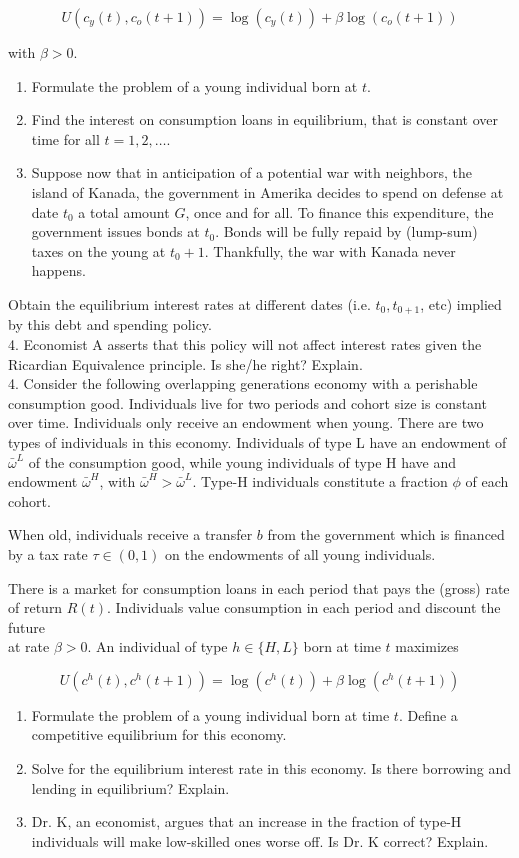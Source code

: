 \documentclass[10pt]{article}
\begin{document}
$$
U\left(c_{y}(t), c_{o}(t+1)\right)=\log \left(c_{y}(t)\right)+\beta \log \left(c_{o}(t+1)\right)
$$

with $\beta>0$.

\begin{enumerate}
  \item Formulate the problem of a young individual born at $t$.
  \item Find the interest on consumption loans in equilibrium, that is constant over time for all $t=1,2, \ldots$.
  \item Suppose now that in anticipation of a potential war with neighbors, the island of Kanada, the government in Amerika decides to spend on defense at date $t_{0}$ a total amount $G$, once and for all. To finance this expenditure, the government issues bonds at $t_{0}$. Bonds will be fully repaid by (lump-sum) taxes on the young at $t_{0}+1$. Thankfully, the war with Kanada never happens.
\end{enumerate}

Obtain the equilibrium interest rates at different dates (i.e. $t_{0}, t_{0+1}$, etc) implied by this debt and spending policy.\\
4. Economist A asserts that this policy will not affect interest rates given the Ricardian Equivalence principle. Is she/he right? Explain.\\
4. Consider the following overlapping generations economy with a perishable consumption good. Individuals live for two periods and cohort size is constant over time. Individuals only receive an endowment when young. There are two types of individuals in this economy. Individuals of type L have an endowment of $\bar{\omega}^{L}$ of the consumption good, while young individuals of type H have and endowment $\bar{\omega}^{H}$, with $\bar{\omega}^{H}>\bar{\omega}^{L}$. Type-H individuals constitute a fraction $\phi$ of each cohort.

When old, individuals receive a transfer $b$ from the government which is financed by a tax rate $\tau \in(0,1)$ on the endowments of all young individuals.

There is a market for consumption loans in each period that pays the (gross) rate of return $R(t)$. Individuals value consumption in each period and discount the future\\
at rate $\beta>0$. An individual of type $h \in\{H, L\}$ born at time $t$ maximizes

$$
U\left(c^{h}(t), c^{h}(t+1)\right)=\log \left(c^{h}(t)\right)+\beta \log \left(c^{h}(t+1)\right)
$$

\begin{enumerate}
  \item Formulate the problem of a young individual born at time $t$. Define a competitive equilibrium for this economy.
  \item Solve for the equilibrium interest rate in this economy. Is there borrowing and lending in equilibrium? Explain.
  \item Dr. K, an economist, argues that an increase in the fraction of type-H individuals will make low-skilled ones worse off. Is Dr. K correct? Explain.
\end{enumerate}
\end{document}
